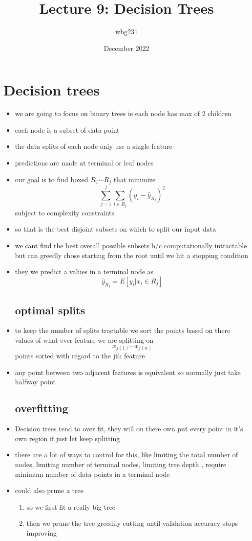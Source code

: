 \documentclass{article}
\title{Lecture 9: Decision Trees}
\author{wbg231 }
\date{December 2022}
\begin{document}
\maketitle

\section{Decision trees}
\begin{itemize}
\subsection*{Decision tree set up}
\item we are going to focus on binary trees ie each node has max of 2 children 
\item each node is a subset of data point 
\item the data splits of each node only use a single feature
\item predictions are made at terminal or leaf nodes 
\item our goal is to find boxed $R_{1}\cdots R_j$ that minimize $$\sum_{j=1}^{j}\sum_{i \in R_{j}}(y_i-\hat{y}_{R_j})^2$$ subject to complexity constraints
\item so that is the best disjoint subsets on which to split our input data 
\item  we cant find the best overall possible subsets b/c computationally intractable but can greedly chose starting from the root until we hit  a stopping condition 
\item they we predict a values in a terminal node as $$\hat{y}_{R_j}=E[y_i|x_i\in R_j]$$
\subsection*{optimal splits}
\item to keep the number of splits tractable we sort the points based on there values of what ever feature we are splitting on $$x_{j(1)}\cdots x_{j(n)}$$ points sorted with regard to the jth feature 
\item any point between two adjacent features is equivalent so normally just take halfway point
\subsection*{overfitting}
\item Decision trees tend to over fit, they will on there own put every point in it's own region if just let keep splitting 
\item there are a lot of ways to control for this, like limiting the total number of nodes, limiting number of terminal nodes, limiting tree depth , require minimum number of data points in a terminal node 
\item could also prune a tree 
\begin{enumerate}
    \item so we first fit a really big tree 
    \item then we prune the tree greedily cutting until validation accuracy stops improving 
\end{enumerate}

\end{itemize}
\end{document}
